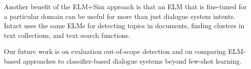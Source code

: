 \documentclass[sigconf, anonymous=true]{acmart}
\begin{document}
Another benefit of the ELM+Sim approach is that an ELM that is fine-tuned for a particular domain can be useful for more than just dialogue system intents. Intact uses the same ELMs for detecting topics in documents, finding clusters in text collections, and text search functions.

Our future work is on evaluation out-of-scope detection and on comparing ELM-based approaches to classifier-based dialogue systems beyond few-shot learning. 




\end{document}
